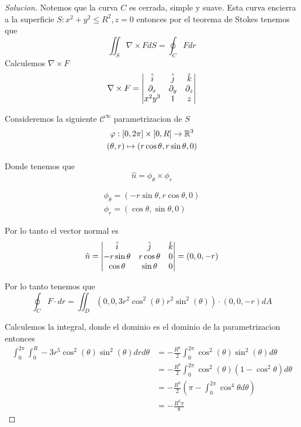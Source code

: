 \documentclass{article}
\theoremstyle{definition}
\newenvironment{solution}{\begin{proof}[Solucion]}{\end{proof}}
\begin{document}
\begin{solution}
  Notemos que la curva $C$ es cerrada, simple y suave. Esta curva encierra a la superficie $S: x^{2} + y^{2} \leq R^{2}, z = 0$ entonces por el teorema de Stokes tenemos que
  \begin{equation*}
    \iint_{S} \nabla \times F dS = \oint_{C} F dr
  \end{equation*}
  Calculemos $\nabla \times F$
  \begin{equation*}
    \nabla \times F = \begin{vmatrix} \hat{i} & \hat{j} & \hat{k}\\ \partial_x & \partial_y & \partial_z\\ x^{2}y^{3} & 1 & z\end{vmatrix}
  \end{equation*}

  Consideremos la siguiente $\mathcal{C}^{\infty}$ parametrizacion de $S$
  \begin{gather*}
    \varphi : [0, 2\pi] \times [0, R] \to \mathbb{R}^{3}\\
    (\theta, r) \mapsto (r \cos \theta, r \sin \theta, 0)
  \end{gather*}

  Donde tenemos que
  \begin{equation*}
    \hat{n} = \phi_{\theta} \times \phi_{r}
  \end{equation*}

  \begin{gather*}
    \phi_{\theta} = (-r \sin \theta, r \cos \theta, 0)\\
    \phi_{r} = (\cos \theta, \sin \theta, 0)
  \end{gather*}

  Por lo tanto el vector normal es
  \begin{equation*}
    \hat{n} = \begin{vmatrix} \hat{i} & \hat{j} & \hat{k}\\ -r \sin \theta & r \cos \theta & 0\\ \cos \theta & \sin \theta & 0\end{vmatrix} = (0, 0, -r)
  \end{equation*}

  Por lo tanto tenemos que
  \begin{equation*}
    \oint_{C} F \cdot dr = \iint_{D} (0, 0, 3r^{2}\cos^{2}(\theta) r^{2} \sin^{2}(\theta)) \cdot (0, 0, -r) dA
  \end{equation*}

  Calculemos la integral, donde el dominio es el dominio de la parametrizacion entonces
  \begin{align*}
    \int_{0}^{2\pi}\int_{0}^{R} -3r^{5}\cos^{2}(\theta)\sin^{2}(\theta) drd\theta &= -\frac{R^{6}}{2} \int_{0}^{2\pi}\cos^{2}(\theta)\sin^{2}(\theta) d\theta\\
                                                                                  &= -\frac{R^{6}}{2} \int_{0}^{2\pi} \cos^{2}(\theta)(1 - \cos^{2} \theta) d\theta\\
                                                                                  &= -\frac{R^{6}}{2} (\pi - \int_{0}^{2\pi} \cos^{4} \theta d \theta)\\
    &= -\frac{R^{6}\pi}{8}
  \end{align*}
\end{solution}
\end{document}
